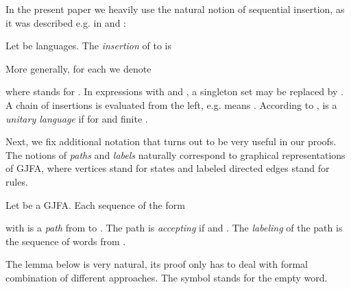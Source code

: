 \documentclass{ws-ijmpc}
\begin{document}
In the present paper we heavily use the natural notion of sequential
insertion, as it was described e.g. in \citep{reaHAU1} and \citep{athKAR2}:
\begin{definition}
Let  be languages. The \emph{insertion }of
 to  is 

More generally, for each  we denote

where  stands for . In expressions with 
and , a singleton set  may be
replaced by . A chain 
of insertions is evaluated from the left, e.g. 
means . According
to \citep{reaEHR2},  is a\emph{ unitary language}
if  for  and finite .
\end{definition}
Next, we fix additional notation that turns out to be very useful
in our proofs. The notions of \emph{paths }and \emph{labels }naturally
correspond to graphical representations of GJFA, where vertices stand
for states and labeled directed edges stand for rules.
\begin{definition}
\label{def: A-path}Let  be a GJFA.
Each sequence of the form 

with  is a \emph{path }from  to .
The path is \emph{accepting }if  and . The
\emph{labeling }of the path is the sequence 
of words from .
\end{definition}
The lemma below is very natural, its proof only has to deal with formal
combination of different approaches. The symbol  stands
for the empty word.
\end{document}
